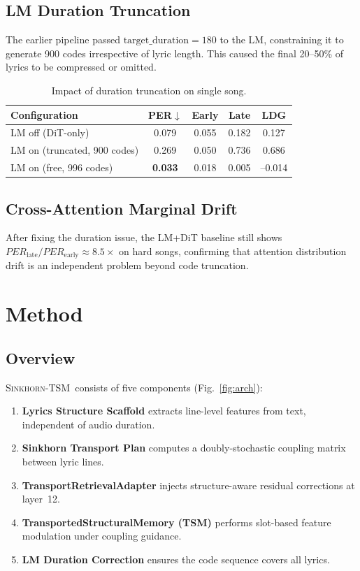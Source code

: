 \documentclass[11pt,a4paper]{article}
\newcommand{\method}{\textsc{Sinkhorn-TSM}}
\newcommand{\per}{PER}
\begin{document}
\subsection{LM Duration Truncation}

The earlier pipeline passed $\text{target\_duration}=180$ to the LM, constraining it to generate 900 codes irrespective of lyric length. This caused the final 20--50\% of lyrics to be compressed or omitted.

\begin{table}[h]
\centering
\caption{Impact of duration truncation on single song.}
\label{tab:truncation}
\begin{tabular}{lcccc}
\toprule
Configuration & \per$\downarrow$ & Early & Late & LDG \\
\midrule
LM off (DiT-only) & 0.079 & 0.055 & 0.182 & 0.127 \\
LM on (truncated, 900 codes) & 0.269 & 0.050 & 0.736 & 0.686 \\
LM on (free, 996 codes) & \textbf{0.033} & 0.018 & 0.005 & --0.014 \\
\bottomrule
\end{tabular}
\end{table}

\subsection{Cross-Attention Marginal Drift}

After fixing the duration issue, the LM+DiT baseline still shows $\per_{\text{late}} / \per_{\text{early}} \approx 8.5\times$ on hard songs, confirming that attention distribution drift is an independent problem beyond code truncation.

\section{Method}
\label{sec:method}

\subsection{Overview}

\method~consists of five components (Fig.~\ref{fig:arch}):

\begin{enumerate}
    \item \textbf{Lyrics Structure Scaffold} extracts line-level features from text, independent of audio duration.
    \item \textbf{Sinkhorn Transport Plan} computes a doubly-stochastic coupling matrix between lyric lines.
    \item \textbf{TransportRetrievalAdapter} injects structure-aware residual corrections at layer~12.
    \item \textbf{TransportedStructuralMemory (TSM)} performs slot-based feature modulation under coupling guidance.
    \item \textbf{LM Duration Correction} ensures the code sequence covers all lyrics.
\end{enumerate}
\end{document}

